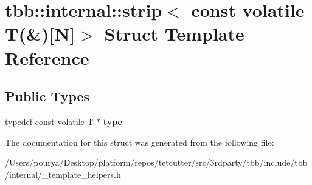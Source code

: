 \hypertarget{structtbb_1_1internal_1_1strip_3_01const_01volatile_01T_07_6_08[N]_4}{}\section{tbb\+:\+:internal\+:\+:strip$<$ const volatile T(\&)\mbox{[}N\mbox{]}$>$ Struct Template Reference}
\label{structtbb_1_1internal_1_1strip_3_01const_01volatile_01T_07_6_08[N]_4}
\subsection*{Public Types}
\begin{DoxyCompactItemize}
\item 
\hypertarget{structtbb_1_1internal_1_1strip_3_01const_01volatile_01T_07_6_08[N]_4_a0d44ce732acb2e0cd492f24628b9ab32}{}typedef const volatile T $\ast$ {\bfseries type}\label{structtbb_1_1internal_1_1strip_3_01const_01volatile_01T_07_6_08[N]_4_a0d44ce732acb2e0cd492f24628b9ab32}

\end{DoxyCompactItemize}


The documentation for this struct was generated from the following file\+:\begin{DoxyCompactItemize}
\item 
/\+Users/pourya/\+Desktop/platform/repos/tetcutter/src/3rdparty/tbb/include/tbb/internal/\+\_\+template\+\_\+helpers.\+h\end{DoxyCompactItemize}
